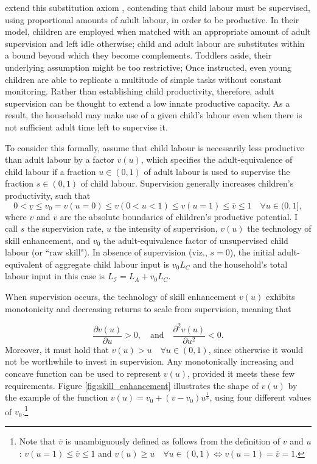 \documentclass[a4paper,12pt]{article}
\theoremstyle{plain}
\theoremstyle{definition}
\theoremstyle{definition}
\theoremstyle{definition}
\theoremstyle{definition}
\begin{document}
\citet{Bar2009} extend this substitution axiom \citep{Basu1998}, contending that child labour must be supervised, using proportional amounts of adult labour, in order to be productive. In their model, children are employed when matched with an appropriate amount of adult supervision and left idle otherwise; child and adult labour are substitutes within a bound beyond which they become complements. Toddlers aside, their underlying assumption might be too restrictive; Once instructed, even young children are able to replicate a multitude of simple tasks without constant monitoring. Rather than establishing child productivity, therefore, adult supervision can be thought to extend a low innate productive capacity. As a result, the household may make use of a given child's labour even when there is not sufficient adult time left to supervise it. 

To consider this formally, assume that child labour is necessarily less productive than adult labour by a factor $v(u)$, which specifies the adult-equivalence of child labour if a fraction $u\in (0,1)$ of adult labour is used to supervise the fraction $s\in (0,1)$ of child labour. Supervision generally increases children's productivity, such that
$$0< \underline{v}\leq v_0 = v(u=0)\leq v(0<u<1) \leq v(u=1)\leq\overline{v}\leq 1 \quad \forall u \in (0,1],$$
where $\underline{v}$ and $\overline{v}$ are the absolute boundaries of children's productive potential. I call $s$ the supervision rate, $u$ the intensity of supervision, $v(u)$ the technology of skill enhancement, and $v_0$ the adult-equivalence factor of unsupervised child labour (or ``raw skill"). In absence of supervision (viz., $s=0$), the initial adult-equivalent of aggregate child labour input is $v_0 L_C$ and the household's total labour input in this case is $L_{\mathcal{I}}=L_A + v_0 L_C$.

When supervision occurs, the technology of skill enhancement $v(u)$ exhibits monotonicity and decreasing returns to scale from supervision, meaning that

$$\frac{\partial v(u)}{\partial u}>0, \quad \text{and} \quad \frac{\partial^2 v(u)}{\partial u^2} < 0.$$
Moreover, it must hold that $v(u) > u \quad \forall u \in (0,1)$, since otherwise it would not be worthwhile to invest in supervision. Any monotonically increasing and concave function can be used to represent $v(u)$, provided it meets these few requirements. Figure \ref{fig:skill_enhancement} illustrates the shape of $v(u)$ by the example of the function $v(u)=v_0+(\overline{v}-v_0)u^{\frac{1}{3}}$, using four different values of $v_0$.\footnote{Note that $\overline{v}$ is unambiguously defined as follows from the definition of $v$ and $u$: $v(u=1)\leq\overline{v}\leq 1$ and $v(u)\geq u \quad \forall u \in (0,1) \iff v(u=1)=\overline{v}=1$.}
\end{document}
